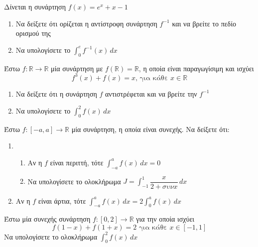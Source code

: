 \documentclass{presentation}
\begin{document}
\begin{askisi}
    Δίνεται η συνάρτηση $f(x)=e^x+x-1$
    \begin{enumerate}
        \item<1-> Να δείξετε ότι ορίζεται η αντίστροφη συνάρτηση $f^{-1}$ και να βρείτε το πεδίο ορισμού της
        \item<2-> Να υπολογίσετε το $\int_{0}^{e} f^{-1}(x) \,dx$
    \end{enumerate}

\end{askisi}

\begin{askisi}
    Έστω $f:\mathbb{R}\to\mathbb{R}$ μία συνάρτηση με $f(\mathbb{R})=\mathbb{R}$, η οποία είναι παραγωγίσιμη και ισχύει
    $$f^3(x)+f(x)=x \text{, για κάθε } x\in\mathbb{R}$$
    \begin{enumerate}
        \item<1-> Να δείξετε ότι η συνάρτηση $f$ αντιστρέφεται και να βρείτε την $f^{-1}$
        \item<2-> Να υπολογίσετε το $\int_{0}^{2} f(x) \,dx$
    \end{enumerate}

\end{askisi}

\begin{askisi}
    Έστω $f:[-a,a]\to\mathbb{R}$ μία συνάρτηση, η οποία είναι συνεχής. Να δείξετε ότι:
    \begin{enumerate}
        \item
              \begin{enumerate}
                  \item<1-> Αν η $f$ είναι περιττή, τότε $\int_{-a}^{a} f(x) \,dx=0$
                  \item<2-> Να υπολογίσετε το ολοκλήρωμα $J=\int_{-1}^{1} \dfrac{x}{2+συνx} \,dx$
              \end{enumerate}
        \item<3-> Αν η $f$ είναι άρτια, τότε $\int_{-a}^{a} f(x) \,dx=2\int_{0}^{a} f(x) \,dx$
    \end{enumerate}

\end{askisi}

\begin{askisi}
    Έστω μία συνεχής συνάρτηση $f:[0,2]\to\mathbb{R}$ για την οποία ισχύει
    $$f(1-x)+f(1+x)=2\text{ για κάθε }x\in [-1,1]$$
    Να υπολογίσετε το ολοκλήρωμα $\int_{0}^{2} f(x) \,dx$

\end{askisi}
\end{document}
